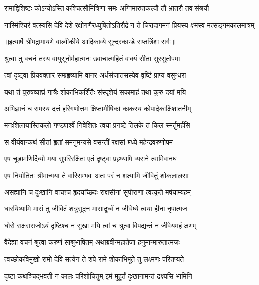 \twolineshloka
{रामाद्विशिष्टः कोऽन्योऽस्ति कश्चित्सौमित्रिणा समः}
{अग्निमारुतकल्पौ तौ भ्रातरौ तव संश्रयौ} %

\fourlineindentedshloka
{नास्मिंश्चिरं वत्स्यसि देवि देशे}
{रक्षोगणैरध्युषितोऽतिरौद्रे}
{न ते चिरादागमनं प्रियस्य}
{क्षमस्व मत्सङ्गमकालमात्रम्} %


{॥इत्यार्षे श्रीमद्रामायणे वाल्मीकीये आदिकाव्ये सुन्दरकाण्डे सप्तत्रिंशः सर्गः॥}


\twolineshloka
{श्रुत्वा तु वचनं तस्य वायुसूनोर्महात्मनः}
{उवाचात्महितं वाक्यं सीता सुरसुतोपमा} %

\twolineshloka
{त्वां दृष्ट्वा प्रियवक्तारं सम्प्रहृष्यामि वानर}
{अर्धसंजातसस्येव वृष्टिं प्राप्य वसुन्धरा} %

\twolineshloka
{यथा तं पुरुषव्याघ्रं गात्रैः शोकाभिकर्शितैः}
{संस्पृशेयं सकामाहं तथा कुरु दयां मयि} %

\twolineshloka
{अभिज्ञानं च रामस्य दत्तं हरिगणोत्तम}
{क्षिप्तामीषिकां काकस्य कोपादेकाक्षिशातनीम्} %

\twolineshloka
{मनःशिलायास्तिकलो गण्डपार्श्वे निवेशितः}
{त्वया प्रनष्टे तिलके तं किल स्मर्तुमर्हसि} %

\twolineshloka
{स वीर्यवान्कथं सीतां हृतां समनुमन्यसे}
{वसन्तीं रक्षसां मध्ये महेन्द्रवरुणोपम} %

\twolineshloka
{एष चूडामणिर्दिव्यो मया सुपरिरक्षितः}
{एतं दृष्ट्वा प्रहृष्यामि व्यसने त्वामिवानघ} %

\twolineshloka
{एष निर्यातितः श्रीमान्मया ते वारिसम्भवः}
{अतः परं न शक्ष्यामि जीवितुं शोकलालसा} %

\twolineshloka
{असह्यानि च दुःखानि वाचश्च हृदयच्छिदः}
{राक्षसीनां सुघोराणां त्वत्कृते मर्षयाम्यहम्} %

\twolineshloka
{धारयिष्यामि मासं तु जीवितं शत्रुसूदन}
{मासादूर्ध्वं न जीविष्ये त्वया हीना नृपात्मज} %

\twolineshloka
{घोरो राक्षसराजोऽयं दृष्टिश्च न सुखा मयि}
{त्वां च श्रुत्वा विपद्यन्तं न जीवेयमहं क्षणम्} %

\twolineshloka
{वैदेह्या वचनं श्रुत्वा करुणं साश्रुभाषितम्}
{अथाब्रवीन्महातेजा हनुमान्मारुतात्मजः} %

\twolineshloka
{त्वच्छोकविमुखो रामो देवि सत्येन ते शपे}
{रामे शोकाभिभूते तु लक्ष्मणः परितप्यते} %

\twolineshloka
{दृष्टा कथञ्चिद्भवती न कालः परिशोचितुम्}
{इमं मुहूर्तं दुःखानामन्तं द्रक्ष्यसि भामिनि} %

